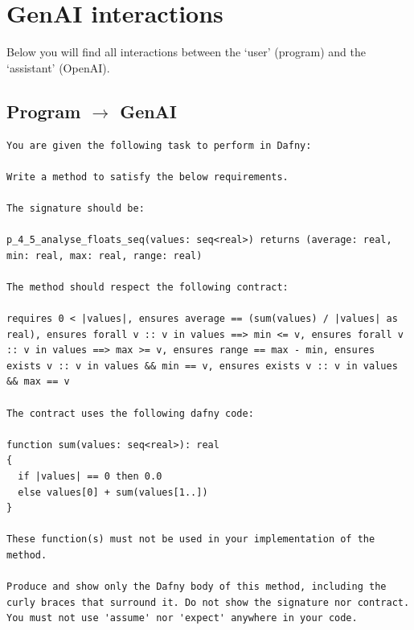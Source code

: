 \documentclass{article}
\begin{document}
\section*{GenAI interactions}
Below you will find all interactions between the `user' (program) and the `assistant' (OpenAI).
\subsection*{Program $\rightarrow$ GenAI}
\begin{lstlisting}
You are given the following task to perform in Dafny:

Write a method to satisfy the below requirements.

The signature should be:

p_4_5_analyse_floats_seq(values: seq<real>) returns (average: real, min: real, max: real, range: real)

The method should respect the following contract:

requires 0 < |values|, ensures average == (sum(values) / |values| as real), ensures forall v :: v in values ==> min <= v, ensures forall v :: v in values ==> max >= v, ensures range == max - min, ensures exists v :: v in values && min == v, ensures exists v :: v in values && max == v

The contract uses the following dafny code:

function sum(values: seq<real>): real
{
  if |values| == 0 then 0.0
  else values[0] + sum(values[1..])
}

These function(s) must not be used in your implementation of the method.

Produce and show only the Dafny body of this method, including the curly braces that surround it. Do not show the signature nor contract. You must not use 'assume' nor 'expect' anywhere in your code.
\end{lstlisting}
\end{document}
